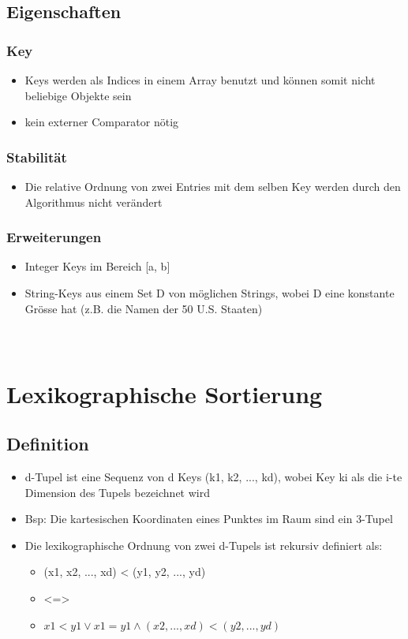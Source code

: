 \subsection{Eigenschaften}
\subsubsection{Key}
\begin{itemize}
    \item Keys werden als Indices in einem Array benutzt und können somit nicht beliebige Objekte sein
    \item kein externer Comparator nötig
\end{itemize}
\subsubsection{Stabilität}
\begin{itemize}
    \item Die relative Ordnung von zwei Entries mit dem selben Key werden durch den Algorithmus nicht verändert
\end{itemize}

\subsubsection{Erweiterungen}
\begin{itemize}
    \item Integer Keys im Bereich [a, b]
    \item String-Keys aus einem Set D von möglichen Strings, wobei D eine konstante Grösse hat (z.B. die Namen der 50 U.S. Staaten)
\end{itemize}

\paragraph{}

\vfill
$ $
\columnbreak


\section{Lexikographische Sortierung}
\subsection{Definition}
\begin{itemize}
    \item d-Tupel ist eine Sequenz von d Keys (k1, k2, ..., kd), wobei Key ki als die i-te Dimension des Tupels bezeichnet wird
    \item Bsp: Die kartesischen Koordinaten eines Punktes im Raum sind ein 3-Tupel
    \item Die lexikographische Ordnung von zwei d-Tupels ist rekursiv definiert als:
    \begin{itemize}
        \item (x1, x2, ..., xd) < (y1, y2, ..., yd)
        \item <=>
        \item $ x1<y1 \vee  x1=y1 \wedge  (x2,...,xd) < (y2,...,yd) $
    \end{itemize}
\end{itemize}

